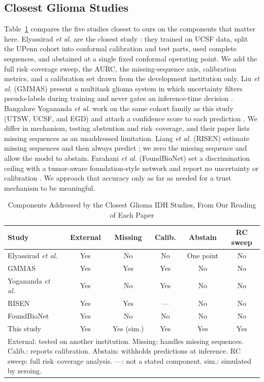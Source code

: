 \documentclass[journal]{IEEEtran}
\begin{document}
\subsection{Closest Glioma Studies}
\label{sec:closest}
Table~\ref{tab:closest} compares the five studies closest to ours on the components that matter here. Elyassirad \emph{et al.} are the closest study \cite{elyassirad2026}: they trained on UCSF data, split the UPenn cohort into conformal calibration and test parts, used complete sequences, and abstained at a single fixed conformal operating point. We add the full risk--coverage sweep, the AURC, the missing-sequence axis, calibration metrics, and a calibration set drawn from the development institution only. Liu \emph{et al.} (GMMAS) present a multitask glioma system in which uncertainty filters pseudo-labels during training and never gates an inference-time decision \cite{liu2026gmmas}. Bangalore Yogananda \emph{et al.} work on the same cohort family as this study (UTSW, UCSF, and EGD) and attach a confidence score to each prediction \cite{yogananda2025}. We differ in mechanism, testing abstention and risk--coverage, and their paper lists missing sequences as an unaddressed limitation. Liang \emph{et al.} (RISEN) estimate missing sequences and then always predict \cite{liang2026risen}; we zero the missing sequence and allow the model to abstain. Farahani \emph{et al.} (FoundBioNet) set a discrimination ceiling with a tumor-aware foundation-style network and report no uncertainty or calibration \cite{farahani2025}. We approach that accuracy only as far as needed for a trust mechanism to be meaningful.

\begin{table}[t]
\centering
\caption{Components Addressed by the Closest Glioma IDH Studies, From Our Reading of Each Paper}
\label{tab:closest}
\footnotesize
\setlength{\tabcolsep}{2.5pt}
\begin{tabular}{lccccc}
\toprule
Study & External & Missing & Calib. & Abstain & RC sweep \\
\midrule
Elyassirad \emph{et al.} & Yes & No & No & One point & No \\
GMMAS & Yes & Yes & Yes & No & No \\
Yogananda \emph{et al.} & Yes & No & Yes & No & No \\
RISEN & Yes & Yes & --- & No & No \\
FoundBioNet & Yes & No & No & No & No \\
This study & Yes & Yes (sim.) & Yes & Yes & Yes \\
\bottomrule
\multicolumn{6}{p{0.9\columnwidth}}{\scriptsize External: tested on another institution. Missing: handles missing sequences. Calib.: reports calibration. Abstain: withholds predictions at inference. RC sweep: full risk--coverage analysis. ---: not a stated component. sim.: simulated by zeroing.}
\end{tabular}
\end{table}
\end{document}
